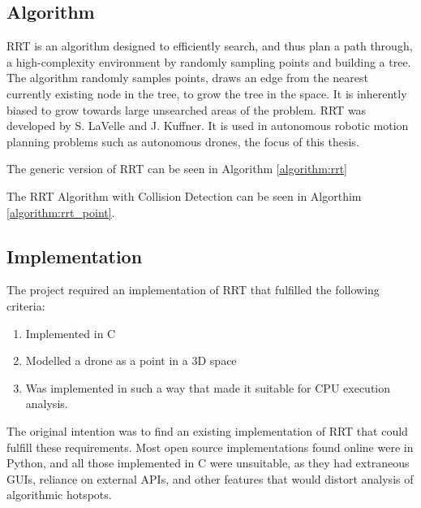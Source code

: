 
\subsection{Algorithm}

    \ac{RRT} is an algorithm designed to efficiently search, and thus plan a path through, a high-complexity environment by randomly sampling points and building a tree. The algorithm randomly samples points, draws an edge from the nearest currently existing node in the tree, to grow the tree in the space. It is inherently biased to grow towards large unsearched areas of the problem. RRT was developed by S. LaVelle\cite{LaValle1998} and J. Kuffner\cite{LaValle2001}. It is used in autonomous robotic motion planning problems such as autonomous drones, the focus of this thesis.

    The generic version of RRT can be seen in Algorithm \ref{algorithm:rrt}
    


    \newpage %

    The RRT Algorithm with Collision Detection can be seen in Algorthim \ref{algorithm:rrt_point}.
    

\subsection{Implementation}
    
    The project required an implementation of RRT that fulfilled the following criteria:

    \begin{enumerate}
        \item Implemented in C
        \item Modelled a drone as a point in a 3D space
        \item Was implemented in such a way that made it suitable for CPU execution analysis.
    \end{enumerate}

    The original intention was to find an existing implementation of RRT that could fulfill these requirements. Most open source implementations found online were in Python, and all those implemented in C were unsuitable\cite{RoboJackets2019}\cite{Planning2019}\cite{Sourishg2017}\cite{Vss2sn2019}, as they had extraneous \ac{GUI}s, reliance on external \ac{API}s, and other features that would distort analysis of algorithmic hotspots.

